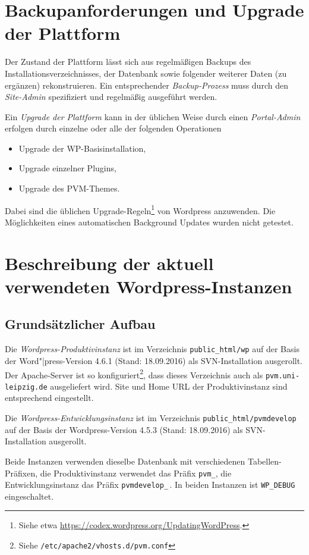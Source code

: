 \documentclass[11pt,a4paper]{article}
\begin{document}
\section{Backupanforderungen und Upgrade der Plattform}

Der Zustand der Plattform lässt sich aus regelmäßigen Backups des
Installationsverzeichnisses, der Datenbank sowie folgender weiterer Daten (zu
ergänzen) rekonstruieren. Ein entsprechender \emph{Backup-Prozess} muss durch
den \emph{Site-Admin} spezifiziert und regelmäßig ausgeführt werden.

Ein \emph{Upgrade der Plattform} kann in der üblichen Weise durch einen
\emph{Portal-Admin} erfolgen durch einzelne oder alle der folgenden
Operationen
\begin{itemize}
\item Upgrade der WP-Basisinstallation, 
\item Upgrade einzelner Plugins, 
\item Upgrade des PVM-Themes. 
\end{itemize}
Dabei sind die üblichen Upgrade-Regeln\footnote{Siehe etwa
  \url{https://codex.wordpress.org/UpdatingWordPress}. } von Wordpress
anzuwenden. Die Möglichkeiten eines automatischen Background Updates wurden
nicht getestet.


\section{Beschreibung der aktuell verwendeten Wordpress-Instanzen}


\subsection{Grundsätzlicher Aufbau}

Die \emph{Wordpress-Produktivinstanz} ist im Verzeichnis
\texttt{public\_html/wp} auf der Basis der Word"|press-Version 4.6.1 (Stand:
18.09.2016) als SVN-Installation ausgerollt. Der Apache-Server ist so
konfiguriert\footnote{Siehe \texttt{/etc/apache2/vhosts.d/pvm.conf} }, dass
dieses Verzeichnis auch als \texttt{pvm.uni-leipzig.de} ausgeliefert wird. Site
und Home URL der Produktivinstanz sind entsprechend eingestellt.

Die \emph{Wordpress-Entwicklungsinstanz} ist im Verzeichnis
\texttt{public\_html/pvmdevelop} auf der Basis der Wordpress-Version 4.5.3
(Stand: 18.09.2016) als SVN-Installation ausgerollt.

Beide Instanzen verwenden dieselbe Datenbank mit verschiedenen
Tabellen-Präfixen, die Produktivinstanz verwendet das Präfix \texttt{pvm\_},
die Entwicklungsinstanz das Präfix \texttt{pvmdevelop\_}\,. In beiden Instanzen
ist \texttt{WP\_DEBUG} eingeschaltet.
\end{document}
